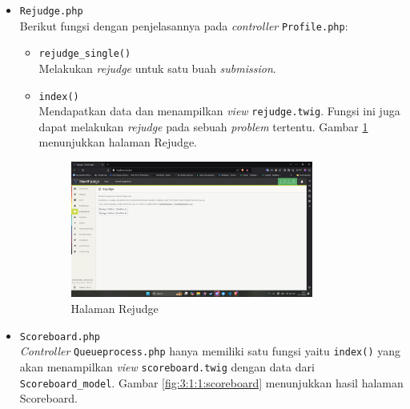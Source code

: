 \documentclass[a4paper,twoside]{article}
\begin{document}
\begin{enumerate}
\begin{itemize}
\begin{itemize}
			            \item \verb|Rejudge.php| \\
			                  Berikut fungsi dengan penjelasannya pada \textit{controller} \verb|Profile.php|:

			                  \begin{itemize}
				                  \item \verb|rejudge_single()| \\
				                        Melakukan \textit{rejudge} untuk satu buah \textit{submission}.
				                  \item \verb|index()| \\
				                        Mendapatkan data dan menampilkan \textit{view} \verb|rejudge.twig|. Fungsi ini juga dapat melakukan \textit{rejudge} pada sebuah \textit{problem} tertentu. Gambar \ref{fig:3:1:1:rejudge} menunjukkan halaman Rejudge.

				                        \begin{figure}[H]
					                        \centering
					                        \includegraphics[width=0.8\textwidth]{views/rejudge.png}
					                        \caption{Halaman Rejudge}
					                        \label{fig:3:1:1:rejudge}
				                        \end{figure}

			                  \end{itemize}

			            \item \verb|Scoreboard.php| \\
			                  \textit{Controller} \verb|Queueprocess.php| hanya memiliki satu fungsi yaitu \verb|index()| yang akan menampilkan \textit{view} \verb|scoreboard.twig| dengan data dari \verb|Scoreboard_model|. Gambar \ref{fig:3:1:1:scoreboard} menunjukkan hasil halaman Scoreboard.


\end{itemize}
\end{itemize}
\end{enumerate}
\end{document}
